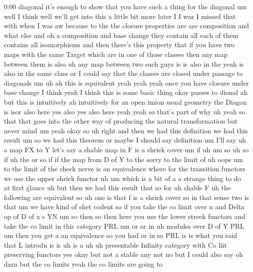 \begin{unfinished}{0:00}
diagonal  it's  enough  to  show  that  you
have  such  a  thing  for  the  diagonal  um
well  I  think  well  we'll  get  into  this  a
little  bit  more  later  I  I  was  I  missed
that  with  when  I  was  aw  because  to  the
the  closure  properties  are  are
composition  and  what  else  and  oh  a
composition  and  base  change  they  contain
all  each  of  them  contains  all
isomorphisms  and  then  there's  this
property  that  if  you  have  two  maps  with
the  same  Target  which  are  in  one  of
those  classes  then  any  map  between  them
is  also  uh  any  map  between  two  such  guys
is  is  also  in  the  yeah  is  also  in  the
same  class  or  I  could  say  that  the
classes  are  closed  under  passage  to
diagonals
um  uh  ah  this  is  equivalent  yeah  yeah
yeah  once  you  have  closure  under  base
change  I  think  yeah  I  think  this  is  some
basic  thing  okay  passes  to
dional  ah  but  this  is
intuitively  ah  intuitively  for  an  open
imion  usual  geometry  the  Diagon  is  isor
also  here  yes  also  yes  also  here  yeah
yeah  so  that's  part  of  why  uh  yeah  so
that  that  goes  into  the  other  way  of
producing  the  natural  transformation  but
never  mind
um  yeah  okay
so  uh  right  and  then  we  had  this
definition  we  had  this  result  um  so  we
had  this
theorem  or  maybe  I  should  say  definition
um  I'll
say
uh  a
map  FX  to  Y  let's  say  a  shable
map  in
F  is  a  shriek
cover
um  if
uh
um
so
uh
so  if
uh  the  or  so  if  if  the  map  from  D  of  Y
to  the  sorry  to  the  limit  of  uh
oops
um  to  the  limit  of  the  check  nerve  is  an
equivalence  where  for  the  transition
functors  we  use  the  upper  shriek  functor
uh
um  which  is  a  bit  of  a  a  strange  thing
to  do  at  first
glance  uh  but  then  we  had  this  result
that  so
for  uh  shable
F  uh  the  following  are  equivalent  so  uh
one  is  that  f  is  a  shriek
cover  so  in  that  sense  two  is  that  um  we
have  kind  of  shet  codent  so  if  you  take
the  co  limit  over  n  and  Delta  op  of  D  of
x  s  YN
um  so  then  so  then  here  you  use  the
lower  streek  functors  and  take  the  co
limit  in  this  category  PRL
um  or  or  in  uh  modules  over  D  of  Y
PRL  um  then  you  get  a  an  equivalence  so
you  had  or
in  so  PRL  is  is  what  you  said  that  L
introdu  is
is
uh  is  a  uh
uh  presentable  Infinity  category  with  Co
liit  preserving  functors  yes  okay  but
not  a  stable  any  not  no  but  I  could  also
say  oh  darn  but  the  co
limits  yeah  the  co  limits  are  going  to

\end{unfinished}
